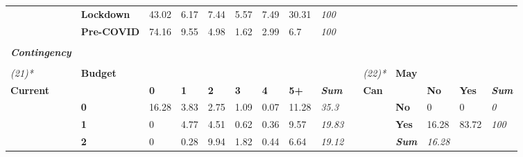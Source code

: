 \begin{table}
{\begin{threeparttable}
\begin{tabular}{lllllllllllllll}
 &
  \textbf{Lockdown} &
  \cellcolor[HTML]{CDCDCD}43.02 &
  \cellcolor[HTML]{FAFAFA}6.17 &
  \cellcolor[HTML]{F8F8F8}7.44 &
  \cellcolor[HTML]{FBFBFB}5.57 &
  \cellcolor[HTML]{F8F8F8}7.49 &
  \cellcolor[HTML]{DCDCDC}30.31 &
  \textit{100} &
   &
   &
   &
   &
   &
  \textit{} \\
 &
  \textbf{Pre-COVID} &
  \cellcolor[HTML]{A6A6A6}74.16 &
  \cellcolor[HTML]{F6F6F6}9.55 &
  \cellcolor[HTML]{FBFBFB}4.98 &
  \cellcolor[HTML]{FFFFFF}1.62 &
  \cellcolor[HTML]{FEFEFE}2.99 &
  \cellcolor[HTML]{F9F9F9}6.7 &
  \textit{100} &
   &
   &
   &
   &
   &
  \textit{} \\
 &
  \textbf{} &
   &
   &
   &
   &
   &
   &
  \textit{} &
   &
   &
   &
   &
   &
  \textit{} \\
\textit{\textbf{Contingency}} &
   &
   &
   &
   &
   &
   &
   &
  \textit{} &
   &
   &
   &
   &
   &
  \textit{} \\
 &
  \textbf{} &
   &
   &
   &
   &
   &
   &
  \textit{} &
   &
   &
   &
   &
   &
  \textit{} \\
\textit{(21)*} &
  \textbf{Budget} &
   &
   &
   &
   &
   &
   &
  \textit{} &
   &
  \textit{(22)*} &
  \textbf{May} &
   &
   &
  \textit{} \\
\textbf{Current} &
   &
  \textbf{0} &
  \textbf{1} &
  \textbf{2} &
  \textbf{3} &
  \textbf{4} &
  \textbf{5+} &
  \textit{\textbf{Sum}} &
  \textbf{} &
  \textbf{Can} &
   &
  \textbf{No} &
  \textbf{Yes} &
  \textit{\textbf{Sum}} \\
 &
  \textbf{0} &
  \cellcolor[HTML]{A6A6A6}16.28 &
  \cellcolor[HTML]{EBEBEB}3.83 &
  \cellcolor[HTML]{F0F0F0}2.75 &
  \cellcolor[HTML]{FAFAFA}1.09 &
  \cellcolor[HTML]{FFFFFF}0.07 &
  \cellcolor[HTML]{C2C2C2}11.28 &
  \textit{35.3} &
   &
   &
  \textbf{No} &
  \cellcolor[HTML]{FFFFFF}0 &
  \cellcolor[HTML]{FFFFFF}0 &
  \textit{0} \\
 &
  \textbf{1} &
  \cellcolor[HTML]{FFFFFF}0 &
  \cellcolor[HTML]{E5E5E5}4.77 &
  \cellcolor[HTML]{E7E7E7}4.51 &
  \cellcolor[HTML]{FCFCFC}0.62 &
  \cellcolor[HTML]{FEFEFE}0.36 &
  \cellcolor[HTML]{CBCBCB}9.57 &
  \textit{19.83} &
   &
   &
  \textbf{Yes} &
  \cellcolor[HTML]{EEEEEE}16.28 &
  \cellcolor[HTML]{A6A6A6}83.72 &
  \textit{100} \\
 &
  \textbf{2} &
  \cellcolor[HTML]{FFFFFF}0 &
  \cellcolor[HTML]{FEFEFE}0.28 &
  \cellcolor[HTML]{C9C9C9}9.94 &
  \cellcolor[HTML]{F6F6F6}1.82 &
  \cellcolor[HTML]{FDFDFD}0.44 &
  \cellcolor[HTML]{DBDBDB}6.64 &
  \textit{19.12} &
   &
   &
  \textit{\textbf{Sum}} &
  \textit{16.28} &

\end{tabular}
\end{threeparttable}}
\end{table}

